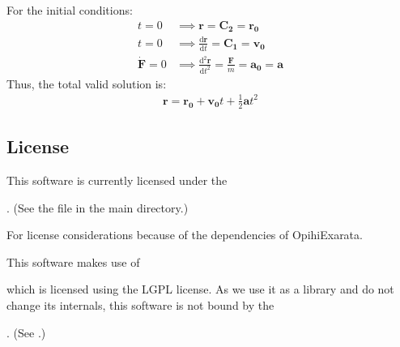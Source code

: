 \documentclass[letterpaper,11pt,english]{sphinxmanual}
\begin{document}
\sphinxAtStartPar
For the initial conditions:
\begin{equation*}
\begin{split}t = 0 &\implies \mathbf{r} = \mathbf{C_2} = \mathbf{r_0} \\
t = 0 &\implies \frac{\mathrm{d}\mathbf{r}}{\mathrm{d}t} = \mathbf{C_1} = \mathbf{v_0} \\
\dot{\mathbf{F}} = 0 &\implies \frac{\mathrm{d}^2\mathbf{r}}{\mathrm{d}t^2} = \frac{\mathbf{F}}{m} = \mathbf{a_0} = \mathbf{a}\end{split}
\end{equation*}
\sphinxAtStartPar
Thus, the total valid solution is:
\begin{equation*}
\begin{split}\mathbf{r} = \mathbf{r_0} + \mathbf{v_0} t + \frac{1}{2} \mathbf{a} t^2\end{split}
\end{equation*}
\sphinxstepscope


\subsection{License}
\label{\detokenize{technical/license:license}}\label{\detokenize{technical/license:technical-architecture-license}}\label{\detokenize{technical/license::doc}}
\sphinxAtStartPar
This software is currently licensed under the
%
\begin{footnote}[69]\sphinxAtStartFootnote
{}
%
\end{footnote}.
(See the  file in the main  directory.)

\sphinxAtStartPar
For license considerations because of the dependencies of OpihiExarata.

\sphinxAtStartPar
This software makes use of %
\begin{footnote}[70]\sphinxAtStartFootnote
{}
%
\end{footnote} which
is licensed using the LGPL license. As we use it as a library and do not
change its internals, this software is not bound by the
%
\begin{footnote}[71]\sphinxAtStartFootnote
{}
%
\end{footnote}.
(See {\hyperref[\detokenize{technical/architecture/graphical_user_interface:technical-architecture-graphical-user-interface}]{}}.)
\end{document}
